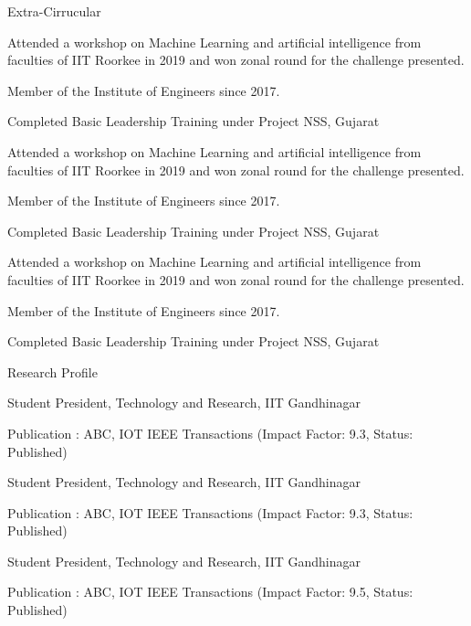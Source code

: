 \documentclass{resume}
\begin{document}
\begin{rSection}{Extra-Cirrucular} 
\item Attended a workshop on Machine Learning and artificial intelligence from faculties of IIT Roorkee in 2019 and won zonal round for the challenge presented.
\item Member of the  Institute of Engineers since 2017.
\item Completed Basic Leadership Training under Project NSS, Gujarat
\item Attended a workshop on Machine Learning and artificial intelligence from faculties of IIT Roorkee in 2019 and won zonal round for the challenge presented.
\item Member of the  Institute of Engineers since 2017.
\item Completed Basic Leadership Training under Project NSS, Gujarat
\item Attended a workshop on Machine Learning and artificial intelligence from faculties of IIT Roorkee in 2019 and won zonal round for the challenge presented.
\item Member of the  Institute of Engineers since 2017.
\item Completed Basic Leadership Training under Project NSS, Gujarat

\end{rSection}
\begin{rSection}{Research Profile}
 \item Student President, Technology and Research, IIT Gandhinagar
 \item Publication : ABC, IOT IEEE Transactions (Impact Factor: 9.3, Status: Published)
 \item Student President, Technology and Research, IIT Gandhinagar
 \item Publication : ABC, IOT IEEE Transactions (Impact Factor: 9.3, Status: Published)
 \item Student President, Technology and Research, IIT Gandhinagar
 \item Publication : ABC, IOT IEEE Transactions (Impact Factor: 9.5, Status: Published)
\end{rSection}
\end{document}

